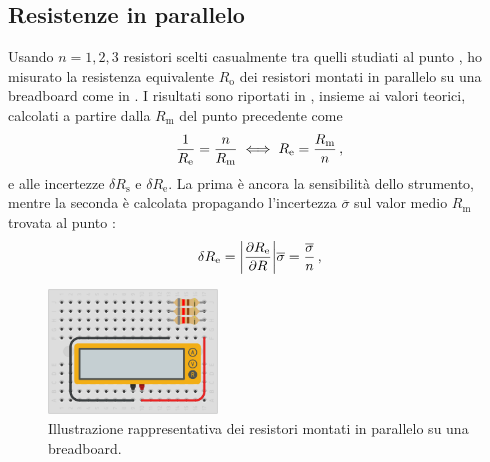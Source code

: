             \subsection{Resistenze in parallelo}
                Usando $n = 1, 2, 3$ resistori scelti casualmente tra quelli studiati al punto , ho misurato la resistenza equivalente $R_\text{o}$ dei resistori montati in parallelo su una breadboard come in . I risultati sono riportati in , insieme ai valori teorici, calcolati a partire dalla $R_\text{m}$ del punto precedente come
                \begin{equation*}
                    \frac{1}{R_\text{e}}
                    = \frac{n}{R_\text{m}}
                    \iff R_\text{e} = \frac{R_\text{m}}{n}
                    \,,
                \end{equation*}
                e alle incertezze $\delta R_\text{s}$ e $\delta R_\text{e}$. La prima è ancora la sensibilità dello strumento, mentre la seconda è calcolata propagando l'incertezza $\overline{\sigma}$ sul valor medio $R_\text{m}$ trovata al punto :
                \begin{equation*}
                    \delta R_\text{e}
                    = \abs{\pdv{R_\text{e}}{R}}\overline{\sigma}
                    = \frac{\overline{\sigma}}{n}
                    \,,
                \end{equation*}
                \begin{figure}
                    \centering
                    \includegraphics[width=0.4\textwidth]{images/multimetro/res-parallelo.png}
                    \caption{Illustrazione rappresentativa dei resistori montati in parallelo su una breadboard.}
                    \label{fig:mul:res-parallelo}
                \end{figure}
                \begin{table}
                    \centering
                    
                    \caption{Resistenze equivalenti misurate su resistori in parallelo e relative incertezze. Tutti i valori sono espressi in \unit{\ohm}.}
                    \label{tab:mul:res-parallelo}
                \end{table}


